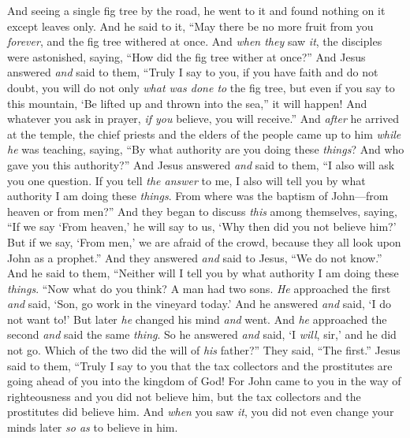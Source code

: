 \begin{biblechapter}
\verse And seeing a single fig tree by the road, he went to it and found nothing on it except leaves only. And he said to it, “May there be no more fruit from you \textit{forever}, and the fig tree withered at once.
\verse And \textit{when they} saw \textit{it}, the disciples were astonished, saying, “How did the fig tree wither at once?”
\verse And Jesus answered \textit{and} said to them, “Truly I say to you, if you have faith and do not doubt, you will do not only \textit{what was done to} the fig tree, but even if you say to this mountain, ‘Be lifted up and thrown into the sea,” it will happen!
\verse And whatever you ask in prayer, \textit{if you} believe, you will receive.”
 And \textit{after} he arrived at the temple, the chief priests and the elders of the people came up to him \textit{while he} was teaching, saying, “By what authority are you doing these \textit{things}? And who gave you this authority?”
\verse And Jesus answered \textit{and} said to them, “I also will ask you one question. If you tell \textit{the answer} to me, I also will tell you by what authority I am doing these \textit{things}.
\verse From where was the baptism of John—from heaven or from men?” And they began to discuss \textit{this} among themselves, saying, “If we say ‘From heaven,’ he will say to us, ‘Why then did you not believe him?’
\verse But if we say, ‘From men,’ we are afraid of the crowd, because they all look upon John as a prophet.”
\verse And they answered \textit{and} said to Jesus, “We do not know.” And he said to them, “Neither will I tell you by what authority I am doing these \textit{things}.
 “Now what do you think? A man had two sons. \textit{He} approached the first \textit{and} said, ‘Son, go work in the vineyard today.’
\verse And he answered \textit{and} said, ‘I do not want to!’ But later \textit{he} changed his mind \textit{and} went.
\verse And \textit{he} approached the second \textit{and} said the same \textit{thing}. So he answered \textit{and} said, ‘I \textit{will}, sir,’ and he did not go.
\verse Which of the two did the will of \textit{his} father?” They said, “The first.” Jesus said to them, “Truly I say to you that the tax collectors and the prostitutes are going ahead of you into the kingdom of God!
\verse For John came to you in the way of righteousness and you did not believe him, but the tax collectors and the prostitutes did believe him. And \textit{when} you saw \textit{it}, you did not even change your minds later \textit{so as} to believe in him.

\end{biblechapter}

